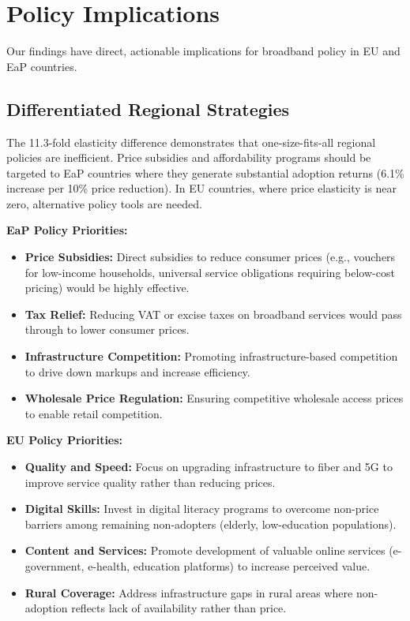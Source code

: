 \documentclass[12pt,review]{elsarticle}
\begin{document}
\section{Policy Implications}
\label{sec:policy}

Our findings have direct, actionable implications for broadband policy in EU and EaP countries.

\subsection{Differentiated Regional Strategies}

The 11.3-fold elasticity difference demonstrates that one-size-fits-all regional policies are inefficient. Price subsidies and affordability programs should be targeted to EaP countries where they generate substantial adoption returns (6.1\% increase per 10\% price reduction). In EU countries, where price elasticity is near zero, alternative policy tools are needed.

\textbf{EaP Policy Priorities:}
\begin{itemize}
\item \textbf{Price Subsidies:} Direct subsidies to reduce consumer prices (e.g., vouchers for low-income households, universal service obligations requiring below-cost pricing) would be highly effective.
\item \textbf{Tax Relief:} Reducing VAT or excise taxes on broadband services would pass through to lower consumer prices.
\item \textbf{Infrastructure Competition:} Promoting infrastructure-based competition to drive down markups and increase efficiency.
\item \textbf{Wholesale Price Regulation:} Ensuring competitive wholesale access prices to enable retail competition.
\end{itemize}

\textbf{EU Policy Priorities:}
\begin{itemize}
\item \textbf{Quality and Speed:} Focus on upgrading infrastructure to fiber and 5G to improve service quality rather than reducing prices.
\item \textbf{Digital Skills:} Invest in digital literacy programs to overcome non-price barriers among remaining non-adopters (elderly, low-education populations).
\item \textbf{Content and Services:} Promote development of valuable online services (e-government, e-health, education platforms) to increase perceived value.
\item \textbf{Rural Coverage:} Address infrastructure gaps in rural areas where non-adoption reflects lack of availability rather than price.
\end{itemize}
\end{document}
